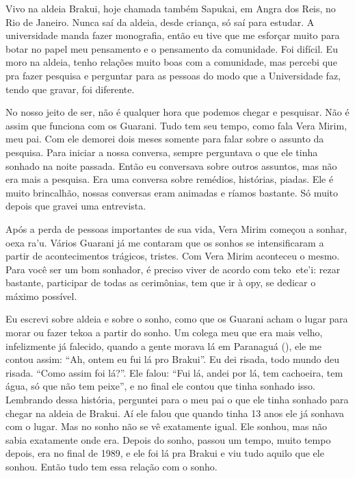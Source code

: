 Vivo na aldeia Brakui, hoje chamada também Sapukai, em Angra dos Reis,
no Rio de Janeiro. Nunca saí da aldeia, desde criança, só saí para
estudar. A universidade manda fazer monografia, então eu tive que me
esforçar muito para botar no papel meu pensamento e o pensamento da
comunidade. Foi difícil. Eu moro na aldeia, tenho relações muito boas
com a comunidade, mas percebi que pra fazer pesquisa e perguntar para
as pessoas do modo que a Universidade faz, tendo que gravar, foi
diferente.

No nosso jeito de ser, não é qualquer hora que podemos chegar e
pesquisar. Não é assim que funciona com os Guarani. Tudo tem seu tempo,
como fala Vera Mirim, meu pai. Com ele demorei dois meses somente para
falar sobre o assunto da pesquisa. Para iniciar a nossa conversa,
sempre perguntava o que ele tinha sonhado na noite passada. Então eu
conversava sobre outros assuntos, mas não era mais a pesquisa. Era uma
conversa sobre remédios, histórias, piadas. Ele é muito brincalhão,
nossas conversas eram animadas e ríamos bastante. Só muito depois que
gravei uma entrevista. 

Após a perda de pessoas importantes de sua vida, Vera Mirim começou a
sonhar, oexa ra’u. Vários Guarani já me contaram que os sonhos se
intensificaram a partir de acontecimentos trágicos, tristes. Com Vera
Mirim aconteceu o mesmo. Para você ser um bom sonhador, é preciso viver
de acordo com teko~ete’i: rezar bastante, participar de todas as
cerimônias, tem que ir à opy, se dedicar o máximo possível.

Eu escrevi sobre aldeia e sobre o sonho, como que os Guarani acham o
lugar para morar ou fazer tekoa a partir do sonho. Um colega meu que
era mais velho, infelizmente já falecido, quando a gente morava lá em
Paranaguá (), ele me contou assim: ``Ah, ontem eu fui lá pro Brakui''.
Eu dei risada, todo mundo deu risada. ``Como assim foi lá?''. Ele falou:
``Fui lá, andei por lá, tem cachoeira, tem água, só que não tem peixe'',
e no final ele contou que tinha sonhado isso. Lembrando dessa história,
perguntei para o meu pai o que ele tinha sonhado para chegar na aldeia
de Brakui. Aí ele falou que quando tinha 13 anos ele já sonhava com o
lugar. Mas no sonho não se vê exatamente igual. Ele sonhou, mas não
sabia exatamente onde era. Depois do sonho, passou um tempo, muito
tempo depois, era no final de 1989, e ele foi lá pra Brakui e viu tudo
aquilo que ele sonhou. Então tudo tem essa relação com o sonho.

